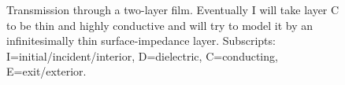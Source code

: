 \documentclass{article}
\begin{document}
\begin{figure}[h]
\caption{Transmission through a two-layer film. Eventually I will take
layer C to be thin and highly conductive and will try to model it 
by an infinitesimally thin surface-impedance layer. 
Subscripts: I=initial/incident/interior, D=dielectric, C=conducting, E=exit/exterior.
}
\label{TwoFilmFigure}
\end{figure}
\end{document}
